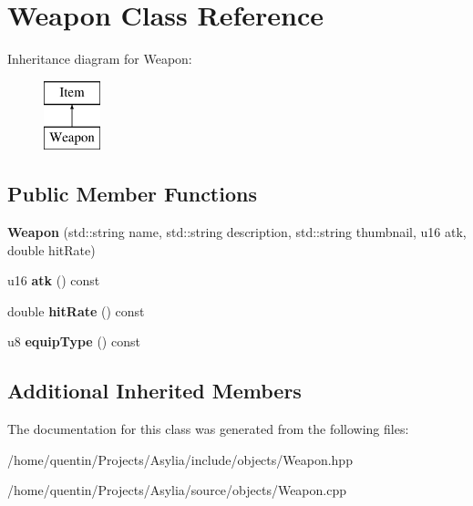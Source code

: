 \hypertarget{classWeapon}{\section{Weapon Class Reference}
\label{classWeapon}
}
Inheritance diagram for Weapon\-:\begin{figure}[H]
\begin{center}
\leavevmode
\includegraphics[height=2.000000cm]{classWeapon}
\end{center}
\end{figure}
\subsection*{Public Member Functions}
\begin{DoxyCompactItemize}
\item 
\hypertarget{classWeapon_aa7ec72341a8f3f6f8a21129ff1f330d2}{{\bfseries Weapon} (std\-::string name, std\-::string description, std\-::string thumbnail, u16 atk, double hit\-Rate)}\label{classWeapon_aa7ec72341a8f3f6f8a21129ff1f330d2}

\item 
\hypertarget{classWeapon_a634ac28e7909b7e99075299e51ff178e}{u16 {\bfseries atk} () const }\label{classWeapon_a634ac28e7909b7e99075299e51ff178e}

\item 
\hypertarget{classWeapon_ad13d6e681b6698cdcb493e426d9fc740}{double {\bfseries hit\-Rate} () const }\label{classWeapon_ad13d6e681b6698cdcb493e426d9fc740}

\item 
\hypertarget{classWeapon_ae4fc252e5bc48bb8c4bb492f751bd963}{u8 {\bfseries equip\-Type} () const }\label{classWeapon_ae4fc252e5bc48bb8c4bb492f751bd963}

\end{DoxyCompactItemize}
\subsection*{Additional Inherited Members}


The documentation for this class was generated from the following files\-:\begin{DoxyCompactItemize}
\item 
/home/quentin/\-Projects/\-Asylia/include/objects/Weapon.\-hpp\item 
/home/quentin/\-Projects/\-Asylia/source/objects/Weapon.\-cpp\end{DoxyCompactItemize}
